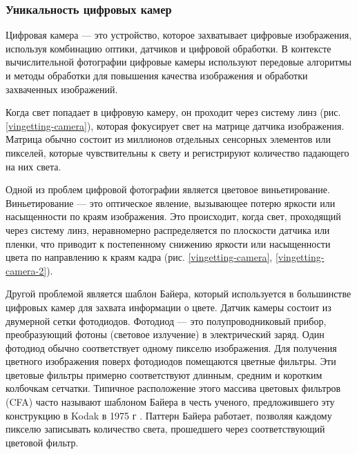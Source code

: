 \subsubsection{Уникальность цифровых камер}\label{sect-1-1-2}

Цифровая камера — это устройство, которое захватывает цифровые изображения, используя комбинацию оптики, датчиков и цифровой обработки. В контексте вычислительной фотографии цифровые камеры используют передовые алгоритмы и методы обработки для повышения качества изображения и обработки захваченных изображений.


Когда свет попадает в цифровую камеру, он проходит через систему линз (рис. \ref{vingetting-camera}), которая фокусирует свет на матрице датчика изображения. Матрица обычно состоит из миллионов отдельных сенсорных элементов или пикселей, которые чувствительны к свету и регистрируют количество падающего на них света.

Одной из проблем цифровой фотографии является цветовое виньетирование. Виньетирование — это оптическое явление, вызывающее потерю яркости или насыщенности по краям изображения. Это происходит, когда свет, проходящий через систему линз, неравномерно распределяется по плоскости датчика или пленки, что приводит к постепенному снижению яркости или насыщенности цвета по направлению к краям кадра (рис. \ref{vingetting-camera}, \ref{vingetting-camera-2}).


Другой проблемой является шаблон Байера, который используется в большинстве цифровых камер для захвата информации о цвете. Датчик камеры состоит из двумерной сетки фотодиодов. Фотодиод — это полупроводниковый прибор, преобразующий фотоны (световое излучение) в электрический заряд. Один фотодиод обычно соответствует одному пикселю изображения. Для получения цветного изображения поверх фотодиодов помещаются цветные фильтры. Эти цветовые фильтры примерно соответствуют длинным, средним и коротким колбочкам сетчатки. Типичное расположение этого массива цветовых фильтров (CFA) часто называют шаблоном Байера в честь ученого, предложившего эту конструкцию в Kodak в 1975 г \cite{lib-bayer}. Паттерн Байера работает, позволяя каждому пикселю записывать количество света, прошедшего через соответствующий цветовой фильтр. 


